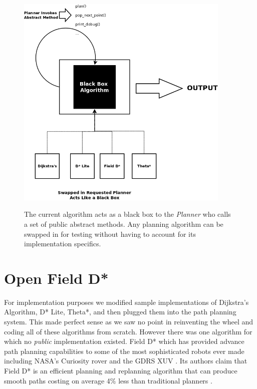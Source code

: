 \begin{figure}[htbp]

\center \includegraphics[width=290pt]{illustrations/abstraction}\\
\caption{The current algorithm acts as a black box to the \textit{Planner} who calls a set of public abstract methods. Any planning algorithm can be swapped in for testing without having to account for its implementation specifics.} 
\label{abstraction_method}

\end{figure}


\newpage

\section{Open Field D*}
\noindent
For implementation purposes we modified sample implementations of Dijkstra's Algorithm, D* Lite, Theta*, and then plugged them into the path planning system. This made perfect sense as we saw no point in reinventing the wheel and coding all of these algorithms from scratch. However there was one algorithm for which no \textit{public} implementation existed. Field D* which has provided advance path planning capabilities to some of the most sophisticated robots ever made including NASA's Curiosity rover and the GDRS XUV \cite{FIELD}. Its authors claim that Field D* is an efficient planning and replanning algorithm that can produce smooth paths costing on average 4\% less than traditional planners \cite{FIELD}. \\

